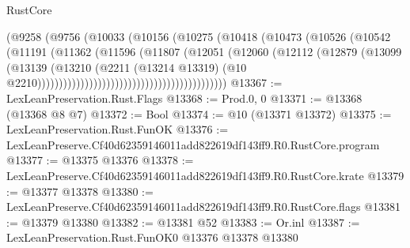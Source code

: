 \begin{lexlean}{RustCore}
\begin{coremodule}
                                                (@9258
                                                  (@9756
                                                    (@10033
                                                      (@10156
                                                        (@10275
                                                          (@10418
                                                            (@10473
                                                              (@10526
                                                                (@10542
                                                                  (@11191
                                                                    (@11362
                                                                      (@11596
                                                                        (@11807
                                                                          (@12051
                                                                            (@12060
                                                                              (@12112
                                                                                (@12879
                                                                                  (@13099
                                                                                    (@13139
                                                                                      (@13210
                                                                                        (@2211
                                                                                          (@13214
                                                                                            @13319)
                                                                                          (@10
                                                                                            @2210))))))))))))))))))))))))))))))))))))))))))))
@13367 := LexLeanPreservation.Rust.Flags
@13368 := Prod.{0, 0}
@13371 := @13368 (@13368 @8 @7)
@13372 := Bool
@13374 := @10 (@13371 @13372)
@13375 := LexLeanPreservation.Rust.FunOK
@13376 := LexLeanPreserve.Cf40d62359146011add822619df143ff9.R0.RustCore.program
@13377 := @13375 @13376
@13378 := LexLeanPreserve.Cf40d62359146011add822619df143ff9.R0.RustCore.krate
@13379 := @13377 @13378
@13380 := LexLeanPreserve.Cf40d62359146011add822619df143ff9.R0.RustCore.flags
@13381 := @13379 @13380
@13382 := @13381 @52
@13383 := Or.inl
@13387 := LexLeanPreservation.Rust.FunOK0 @13376 @13378 @13380

\end{coremodule}
\end{lexlean}
